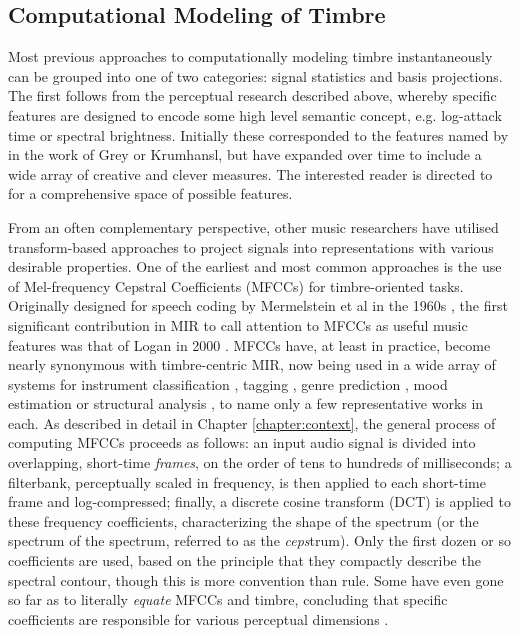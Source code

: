 

\subsection{Computational Modeling of Timbre}
Most previous approaches to computationally modeling timbre instantaneously can be grouped into one of two categories: signal statistics and basis projections.
The first follows from the perceptual research described above, whereby specific features are designed to encode some high level semantic concept, e.g. log-attack time or spectral brightness.
Initially these corresponded to the features named by in the work of Grey or Krumhansl, but have expanded over time to include a wide array of creative and clever measures.
The interested reader is directed to \cite{Essid2006} for a comprehensive space of possible features.

From an often complementary perspective, other music researchers have utilised transform-based approaches to project signals into representations with various desirable properties.
One of the earliest and most common approaches is the use of Mel-frequency Cepstral Coefficients (MFCCs) for timbre-oriented tasks.
Originally designed for speech coding by Mermelstein et al in the 1960s \cite{Mermelstein}, the first significant contribution in MIR to call attention to MFCCs as useful music features was that of Logan in 2000 \cite{Logan}.
MFCCs have, at least in practice, become nearly synonymous with timbre-centric MIR, now being used in a wide array of systems for instrument classification \cite{anyone}, tagging \cite{anyone_else}, genre prediction \cite{jesus}, mood estimation \cite{schmidt} or structural analysis \cite{levy}, to name only a few representative works in each.
As described in detail in Chapter \ref{chapter:context}, the general process of computing MFCCs proceeds as follows: an input audio signal is divided into overlapping, short-time \emph{frames}, on the order of tens to hundreds of milliseconds; a filterbank, perceptually scaled in frequency, is then applied to each short-time frame and log-compressed; finally, a discrete cosine transform (DCT) is applied to these frequency coefficients, characterizing the shape of the spectrum (or the spectrum of the spectrum, referred to as the \emph{ceps}trum).
Only the first dozen or so coefficients are used, based on the principle that they compactly describe the spectral contour, though this is more convention than rule.
Some have even gone so far as to literally \emph{equate} MFCCs and timbre, concluding that specific coefficients are responsible for various perceptual dimensions \cite{Teresawa2007}.

